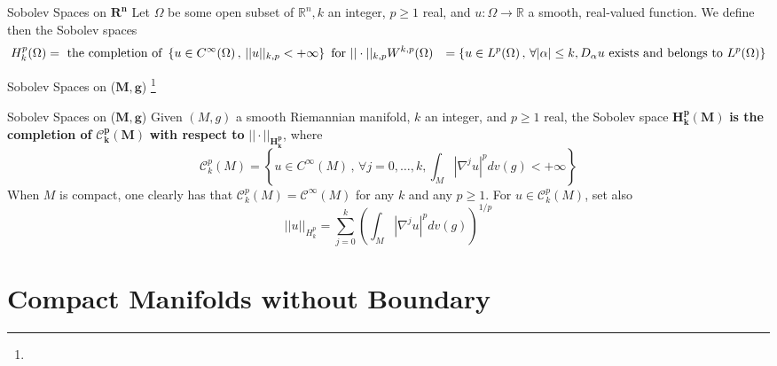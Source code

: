 \documentclass[xcolor=table,dvipsnames,svgnames,aspectratio=169,fontset=fandol]{ctexbeamer}
\let\\\relax
\begin{document}
\begin{frame}{Sobolev Spaces on $\mathbf{R^n}$ }
  Let $\Omega$ be some open subset of $\mathbb{R}^n, k$ an integer, $p \geq 1$ real, and $u: \Omega \rightarrow \mathbb{R}$ a smooth, real-valued function. We define then the Sobolev spaces
  $$
  \begin{aligned}
  H_k^p(\Omega)&=\text { the completion of }\left\{u \in C^{\infty}(\Omega) \,,\,||u||_{k, p}<+\infty\right\} \text { for }||\cdot||_{k, p} \\
  W^{k,p}(\Omega)&=\left\{u \in L^p(\Omega) \,,\, \forall|\alpha| \leq k, D_\alpha u \text { exists and belongs to } L^p(\Omega)\right\}\\
  \end{aligned}
  $$

  \vskip 5pt
  
\end{frame}

\begin{frame}{Sobolev Spaces on ($\mathbf{M,g}$) \footnote{} }
  \begin{alertblock}{Sobolev Spaces on ($\mathbf{M,g}$) }
    Given $(M, g)$ a smooth Riemannian manifold, $k$ an integer, and $p \geq 1$ real, the Sobolev space $\bm{H_k^p(M)}$ \textbf{is the completion of} $\bm{\mathcal{C}_k^p(M)}$ \textbf{with respect to} $\bm{||\cdot||_{H_k^p}}$, where
    \vskip -1pt
    $$
    \mathcal{C}_k^p(M)=\left\{u \in C^{\infty}(M) \,,\, \forall j=0, \ldots, k, \int_M\left|\nabla^j u\right|^p d v(g)<+\infty\right\}
    $$
    When $M$ is compact, one clearly has that $\mathcal{C}_k^p(M)=\mathcal{C}^{\infty}(M)$ for any $k$ and any $p \geq 1$. For $u \in \mathcal{C}_k^p(M)$, set also
    \vskip -1pt
    $$
    ||u||_{H_k^p}=\sum_{j=0}^k\left(\int_M\left|\nabla^j u\right|^p d v(g)\right)^{1 / p}
    $$
  \end{alertblock}
\end{frame}


\section{Compact Manifolds without Boundary}
\end{document}
